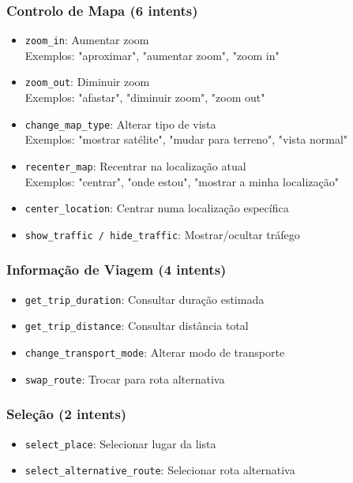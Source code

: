 \subsubsection{Controlo de Mapa (6 intents)}
\begin{itemize}
    \item \texttt{zoom\_in}: Aumentar zoom \\
    Exemplos: "aproximar", "aumentar zoom", "zoom in"

    \item \texttt{zoom\_out}: Diminuir zoom \\
    Exemplos: "afastar", "diminuir zoom", "zoom out"

    \item \texttt{change\_map\_type}: Alterar tipo de vista \\
    Exemplos: "mostrar satélite", "mudar para terreno", "vista normal"

    \item \texttt{recenter\_map}: Recentrar na localização atual \\
    Exemplos: "centrar", "onde estou", "mostrar a minha localização"

    \item \texttt{center\_location}: Centrar numa localização específica

    \item \texttt{show\_traffic / hide\_traffic}: Mostrar/ocultar tráfego
\end{itemize}

\subsubsection{Informação de Viagem (4 intents)}
\begin{itemize}
    \item \texttt{get\_trip\_duration}: Consultar duração estimada
    \item \texttt{get\_trip\_distance}: Consultar distância total
    \item \texttt{change\_transport\_mode}: Alterar modo de transporte
    \item \texttt{swap\_route}: Trocar para rota alternativa
\end{itemize}

\subsubsection{Seleção (2 intents)}
\begin{itemize}
    \item \texttt{select\_place}: Selecionar lugar da lista
    \item \texttt{select\_alternative\_route}: Selecionar rota alternativa
\end{itemize}

